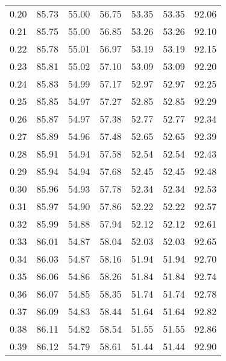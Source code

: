 \begin{tabular}{|c|c|c|c|c|c|c|}
      0.20 &     85.73 &     55.00 &      56.75 &   53.35 &      53.35 &         92.06 \\
      0.21 &     85.75 &     55.00 &      56.85 &   53.26 &      53.26 &         92.10 \\
      0.22 &     85.78 &     55.01 &      56.97 &   53.19 &      53.19 &         92.15 \\
      0.23 &     85.81 &     55.02 &      57.10 &   53.09 &      53.09 &         92.20 \\
      0.24 &     85.83 &     54.99 &      57.17 &   52.97 &      52.97 &         92.25 \\
      0.25 &     85.85 &     54.97 &      57.27 &   52.85 &      52.85 &         92.29 \\
      0.26 &     85.87 &     54.97 &      57.38 &   52.77 &      52.77 &         92.34 \\
      0.27 &     85.89 &     54.96 &      57.48 &   52.65 &      52.65 &         92.39 \\
      0.28 &     85.91 &     54.94 &      57.58 &   52.54 &      52.54 &         92.43 \\
      0.29 &     85.94 &     54.94 &      57.68 &   52.45 &      52.45 &         92.48 \\
      0.30 &     85.96 &     54.93 &      57.78 &   52.34 &      52.34 &         92.53 \\
      0.31 &     85.97 &     54.90 &      57.86 &   52.22 &      52.22 &         92.57 \\
      0.32 &     85.99 &     54.88 &      57.94 &   52.12 &      52.12 &         92.61 \\
      0.33 &     86.01 &     54.87 &      58.04 &   52.03 &      52.03 &         92.65 \\
      0.34 &     86.03 &     54.87 &      58.16 &   51.94 &      51.94 &         92.70 \\
      0.35 &     86.06 &     54.86 &      58.26 &   51.84 &      51.84 &         92.74 \\
      0.36 &     86.07 &     54.85 &      58.35 &   51.74 &      51.74 &         92.78 \\
      0.37 &     86.09 &     54.83 &      58.44 &   51.64 &      51.64 &         92.82 \\
      0.38 &     86.11 &     54.82 &      58.54 &   51.55 &      51.55 &         92.86 \\
      0.39 &     86.12 &     54.79 &      58.61 &   51.44 &      51.44 &         92.90 \\

\end{tabular}
